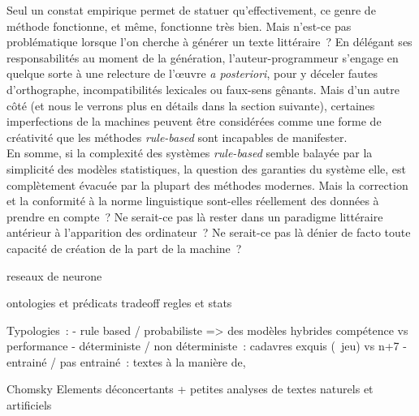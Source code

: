 \documentclass{article}
\begin{document}
			Seul un constat empirique permet de statuer qu'effectivement, ce genre de méthode fonctionne, et même, fonctionne très bien. Mais n'est-ce pas problématique lorsque l'on cherche à générer un texte littéraire~? En délégant ses responsabilités au moment de la génération, l'auteur-programmeur s'engage en quelque sorte à une relecture de l'œuvre \textit{a posteriori}, pour y déceler fautes d'orthographe, incompatibilités lexicales ou faux-sens gênants. Mais d'un autre côté (et nous le verrons plus en détails dans la section suivante), certaines imperfections de la machines peuvent être considérées comme une forme de créativité que les méthodes \textit{rule-based} sont incapables de manifester.\\
			
			En somme, si la complexité des systèmes \textit{rule-based} semble balayée par la simplicité des modèles statistiques, la question des garanties du système elle, est complètement évacuée par la plupart des méthodes modernes. Mais la correction et la conformité à la norme linguistique sont-elles réellement des données à prendre en compte~? Ne serait-ce pas là rester dans un paradigme littéraire antérieur à l'apparition des ordinateur~? Ne serait-ce pas là dénier de facto toute capacité de création de la part de la machine~?
			
			reseaux de neurone
				
			ontologies et prédicats		
		tradeoff regles et stats
		
		
		Typologies~:
		- rule based / probabiliste => des modèles hybrides compétence vs performance
		- déterministe / non déterministe~: cadavres exquis (~jeu) vs n+7
		- entrainé / pas entrainé~: textes à la manière de, 
		
		Chomsky
		Elements déconcertants + petites analyses de textes naturels et artificiels
		\newpage
\end{document}
